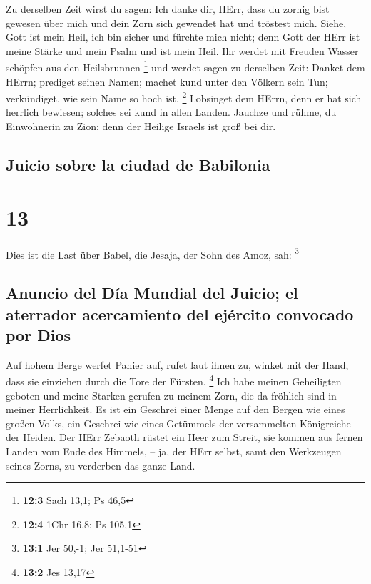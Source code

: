  Zu derselben Zeit wirst du sagen: Ich danke dir, HErr,
dass du zornig bist gewesen über mich und dein Zorn sich gewendet hat
und tröstest mich.  Siehe, Gott ist mein Heil, ich bin
sicher und fürchte mich nicht; denn Gott der HErr ist meine Stärke und
mein Psalm und ist mein Heil.  Ihr werdet mit Freuden
Wasser schöpfen aus den Heilsbrunnen \footnote{\textbf{12:3} Sach 13,1;
  Ps 46,5}  und werdet sagen zu derselben Zeit: Danket dem
HErrn; prediget seinen Namen; machet kund unter den Völkern sein Tun;
verkündiget, wie sein Name so hoch ist. \footnote{\textbf{12:4} 1Chr
  16,8; Ps 105,1}  Lobsinget dem HErrn, denn er hat sich
herrlich bewiesen; solches sei kund in allen Landen. 
Jauchze und rühme, du Einwohnerin zu Zion; denn der Heilige Israels ist
groß bei dir.

\hypertarget{juicio-sobre-la-ciudad-de-babilonia}{%
\subsection{Juicio sobre la ciudad de
Babilonia}\label{juicio-sobre-la-ciudad-de-babilonia}}

\hypertarget{section-12}{%
\section{13}\label{section-12}}

 Dies ist die Last über Babel, die Jesaja, der Sohn des
Amoz, sah: \footnote{\textbf{13:1} Jer 50,-1; Jer 51,1-51}

\hypertarget{anuncio-del-duxeda-mundial-del-juicio-el-aterrador-acercamiento-del-ejuxe9rcito-convocado-por-dios}{%
\subsection{Anuncio del Día Mundial del Juicio; el aterrador
acercamiento del ejército convocado por
Dios}\label{anuncio-del-duxeda-mundial-del-juicio-el-aterrador-acercamiento-del-ejuxe9rcito-convocado-por-dios}}

 Auf hohem Berge werfet Panier auf, rufet laut ihnen zu,
winket mit der Hand, dass sie einziehen durch die Tore der Fürsten.
\footnote{\textbf{13:2} Jes 13,17}  Ich habe meinen
Geheiligten geboten und meine Starken gerufen zu meinem Zorn, die da
fröhlich sind in meiner Herrlichkeit.  Es ist ein Geschrei
einer Menge auf den Bergen wie eines großen Volks, ein Geschrei wie
eines Getümmels der versammelten Königreiche der Heiden. Der HErr
Zebaoth rüstet ein Heer zum Streit,  sie kommen aus fernen
Landen vom Ende des Himmels, -- ja, der HErr selbst, samt den Werkzeugen
seines Zorns, zu verderben das ganze Land.

